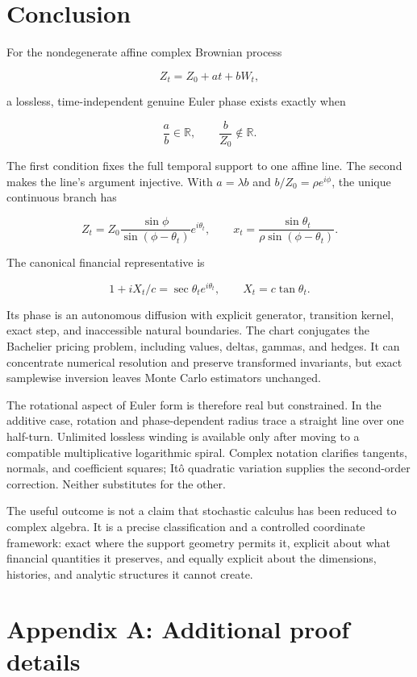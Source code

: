 \documentclass[
  english,
  10pt,
  letterpaper,
  DIV=11,
  numbers=noendperiod]{scrartcl}
\theoremstyle{definition}
\theoremstyle{plain}
\theoremstyle{plain}
\theoremstyle{remark}
\begin{document}
\section{Conclusion}\label{sec-conclusion}

For the nondegenerate affine complex Brownian process

\[
Z_t=Z_0+at+bW_t,
\]

a lossless, time-independent genuine Euler phase exists exactly when

\[
\frac ab\in\mathbb R,
\qquad
\frac b{Z_0}\notin\mathbb R.
\]

The first condition fixes the full temporal support to one affine line.
The second makes the line's argument injective. With \(a=\lambda b\) and
\(b/Z_0=\rho e^{i\phi}\), the unique continuous branch has

\[
Z_t
=
Z_0\frac{\sin\phi}{\sin(\phi-\theta_t)}e^{i\theta_t},
\qquad
x_t
=\frac{\sin\theta_t}{\rho\sin(\phi-\theta_t)}.
\]

The canonical financial representative is

\[
1+iX_t/c
=\sec\theta_t e^{i\theta_t},
\qquad
X_t=c\tan\theta_t.
\]

Its phase is an autonomous diffusion with explicit generator, transition
kernel, exact step, and inaccessible natural boundaries. The chart
conjugates the Bachelier pricing problem, including values, deltas,
gammas, and hedges. It can concentrate numerical resolution and preserve
transformed invariants, but exact samplewise inversion leaves Monte
Carlo estimators unchanged.

The rotational aspect of Euler form is therefore real but constrained.
In the additive case, rotation and phase-dependent radius trace a
straight line over one half-turn. Unlimited lossless winding is
available only after moving to a compatible multiplicative logarithmic
spiral. Complex notation clarifies tangents, normals, and coefficient
squares; Itô quadratic variation supplies the second-order correction.
Neither substitutes for the other.

The useful outcome is not a claim that stochastic calculus has been
reduced to complex algebra. It is a precise classification and a
controlled coordinate framework: exact where the support geometry
permits it, explicit about what financial quantities it preserves, and
equally explicit about the dimensions, histories, and analytic
structures it cannot create.

\section*{Appendix A: Additional proof
details}\label{sec-appendix-proofs}
\end{document}
